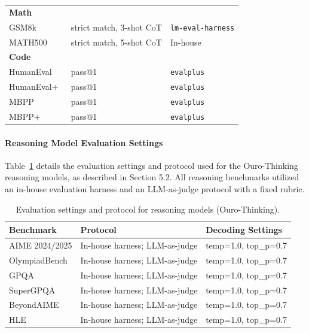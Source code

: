 \documentclass[]{bytedance_seed}
\newcommand{\1}{\mathbf{1}}
\begin{document}
{\begin{table}[htbp]
\begin{tabular}{lll}
\midrule
\multicolumn{3}{l}{\textbf{Math}} \\
\quad GSM8k~\citep{cobbe2021training} & strict match, 3-shot CoT & \texttt{lm-eval-harness} \\
\quad MATH500~\citep{hendrycks2021measuring} & strict match, 5-shot CoT & In-house \\
\midrule
\multicolumn{3}{l}{\textbf{Code}} \\
\quad HumanEval~\citep{chen2021codex}  & pass@1 & \texttt{evalplus} \\
\quad HumanEval+~\citep{evalplus} & pass@1 & \texttt{evalplus}\\
\quad MBPP~\citep{austin2021program} & pass@1 & \texttt{evalplus} \\
\quad MBPP+~\citep{evalplus} & pass@1 & \texttt{evalplus}\\
\bottomrule
\end{tabular}
\end{table}

\paragraph{Reasoning Model Evaluation Settings}
Table~\ref{tab:eval_reasoning_settings} details the evaluation settings and protocol used for the Ouro-Thinking reasoning models, as described in Section 5.2. All reasoning benchmarks utilized an in-house evaluation harness and an LLM-as-judge protocol with a fixed rubric.

\begin{table}[htbp]
\centering
\caption{Evaluation settings and protocol for reasoning models (Ouro-Thinking).}
\label{tab:eval_reasoning_settings}
\footnotesize
\begin{tabular}{lll}
\toprule
\textbf{Benchmark} & \textbf{Protocol} & \textbf{Decoding Settings}\\
\midrule
AIME 2024/2025 & In-house harness; LLM-as-judge & temp=1.0, top\_p=0.7 \\
OlympiadBench & In-house harness; LLM-as-judge & temp=1.0, top\_p=0.7 \\
GPQA & In-house harness; LLM-as-judge & temp=1.0, top\_p=0.7 \\
SuperGPQA & In-house harness; LLM-as-judge & temp=1.0, top\_p=0.7 \\
BeyondAIME & In-house harness; LLM-as-judge & temp=1.0, top\_p=0.7 \\
HLE & In-house harness; LLM-as-judge & temp=1.0, top\_p=0.7 \\
\bottomrule
\end{tabular}
\end{table}

}
\end{document}
